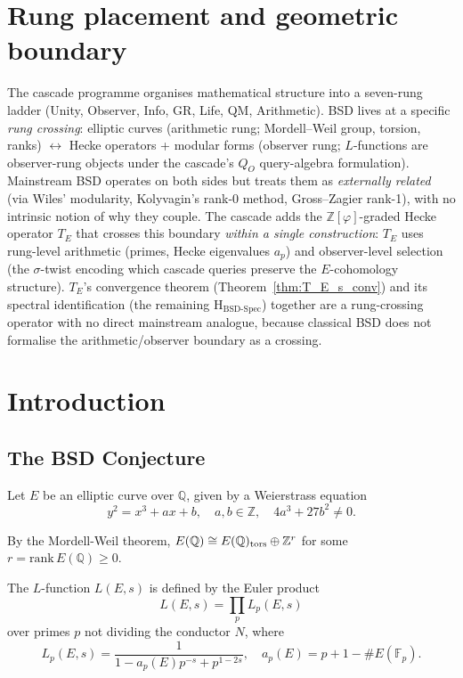 \documentclass[11pt, a4paper]{amsart}
\theoremstyle{definition}
\newcommand{\Q}{\mathbb{Q}}
\newcommand{\Z}{\mathbb{Z}}
\newcommand{\F}{\mathbb{F}}
\begin{document}
\tableofcontents

\section*{Rung placement and geometric boundary}

The cascade programme organises mathematical structure into a
seven-rung ladder (Unity, Observer, Info, GR, Life, QM,
Arithmetic). BSD lives at a specific \emph{rung crossing}:
elliptic curves (arithmetic rung; Mordell--Weil group, torsion,
ranks) $\leftrightarrow$ Hecke operators + modular forms (observer
rung; $L$-functions are observer-rung objects under the cascade's
$Q_O$ query-algebra formulation). Mainstream BSD operates on both
sides but treats them as \emph{externally related} (via Wiles'
modularity, Kolyvagin's rank-0 method, Gross--Zagier rank-1), with
no intrinsic notion of why they couple. The cascade adds the
$\mathbb{Z}[\varphi]$-graded Hecke operator $T_E$ that crosses this
boundary \emph{within a single construction}: $T_E$ uses rung-level
arithmetic (primes, Hecke eigenvalues $a_p$) and observer-level
selection (the $\sigma$-twist encoding which cascade queries
preserve the $E$-cohomology structure). $T_E$'s convergence theorem
(Theorem~\ref{thm:T_E_s_conv}) and its spectral identification
(the remaining H$_{\text{BSD-Spec}}$) together are a rung-crossing
operator with no direct mainstream analogue, because classical BSD
does not formalise the arithmetic/observer boundary as a crossing.

\section{Introduction}

\subsection{The BSD Conjecture}

Let $E$ be an elliptic curve over $\Q$, given by a Weierstrass
equation
\[
y^2 = x^3 + ax + b, \quad a, b \in \Z, \quad 4a^3 + 27b^2 \neq 0.
\]

By the Mordell-Weil theorem, $E(\Q) \cong E(\Q)_{\rm tors} \oplus \Z^r$
for some $r = \mathrm{rank}\, E(\Q) \geq 0$.

The $L$-function $L(E, s)$ is defined by the Euler product
\[
L(E, s) = \prod_p L_p(E, s)
\]
over primes $p$ not dividing the conductor $N$, where
\[
L_p(E, s) = \frac{1}{1 - a_p(E) p^{-s} + p^{1 - 2s}},
\quad a_p(E) = p + 1 - \#E(\F_p).
\]
\end{document}
